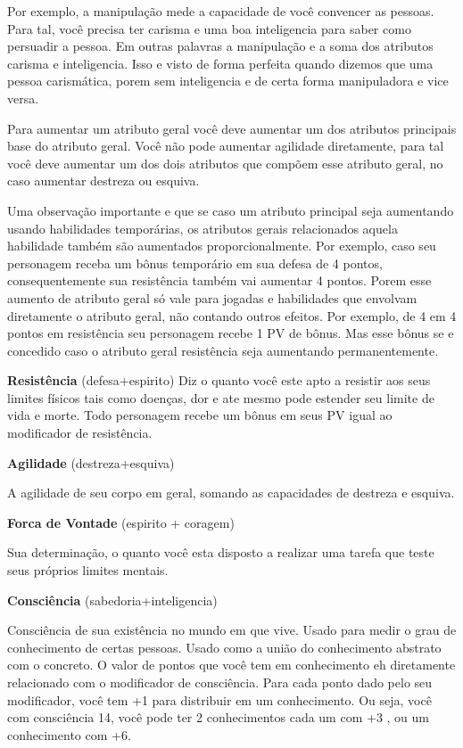 Por exemplo, a manipulação mede a capacidade de você convencer as pessoas. Para tal, você precisa ter carisma e uma boa inteligencia para saber como persuadir a pessoa. Em outras palavras a manipulação e a soma dos atributos carisma e inteligencia. Isso e visto de forma perfeita quando dizemos que uma pessoa carismática, porem sem inteligencia e de certa forma manipuladora e vice versa. 

Para aumentar um atributo geral você deve aumentar um dos atributos principais base do atributo geral. Você não pode aumentar agilidade diretamente, para tal você deve aumentar um dos dois atributos que compõem esse atributo geral, no caso aumentar destreza ou esquiva.

Uma observação importante e que se caso um atributo principal seja aumentando usando habilidades temporárias, os atributos gerais relacionados aquela habilidade também são aumentados proporcionalmente. Por exemplo, caso seu personagem receba um bônus temporário em sua defesa de 4 pontos, consequentemente sua resistência também vai aumentar 4 pontos. Porem esse aumento de atributo geral só vale para jogadas e habilidades que envolvam diretamente o atributo geral, não contando outros efeitos. Por exemplo, de 4 em 4 pontos em resistência seu personagem recebe 1 PV de bônus. Mas esse bônus se e concedido caso o atributo geral resistência seja aumentando permanentemente.

\textbf{Resistência} (defesa+espirito)
Diz o quanto você este apto a resistir aos seus limites físicos tais como doenças, dor e ate mesmo pode estender seu limite de vida e morte. Todo personagem recebe um bônus em seus PV igual ao modificador de resistência.

\textbf{Agilidade} (destreza+esquiva)

A agilidade de seu corpo em geral, somando as capacidades de destreza e esquiva.

\textbf{Forca de Vontade} (espirito + coragem)

Sua determinação, o quanto você esta disposto a realizar uma tarefa que teste seus próprios limites mentais.


\textbf{Consciência} (sabedoria+inteligencia)

Consciência de sua existência no mundo em que vive. Usado para medir o grau de conhecimento de certas pessoas. Usado como a união do conhecimento abstrato com o concreto. O valor de pontos que você tem em conhecimento eh diretamente relacionado com o modificador de consciência. Para cada ponto dado pelo seu modificador, você tem +1 para distribuir em um conhecimento. Ou seja, você com consciência 14, você pode ter 2 conhecimentos cada um com +3 , ou um conhecimento com +6.

